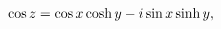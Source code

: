 \[\mathop{\cos\/}\nolimits z=\mathop{\cos\/}\nolimits x\mathop{\cosh\/}\nolimits
y%
-i\mathop{\sin\/}\nolimits x\mathop{\sinh\/}\nolimits y,\]
